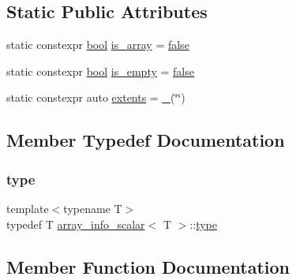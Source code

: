 \subsection*{Static Public Attributes}
\begin{DoxyCompactItemize}
\item 
static constexpr \mbox{\hyperlink{asdl_8h_af6a258d8f3ee5206d682d799316314b1}{bool}} \mbox{\hyperlink{structarray__info__scalar_a47f7961dd80e4ade11cd580835b12083}{is\+\_\+array}} = \mbox{\hyperlink{asdl_8h_af6a258d8f3ee5206d682d799316314b1ae9de385ef6fe9bf3360d1038396b884c}{false}}
\item 
static constexpr \mbox{\hyperlink{asdl_8h_af6a258d8f3ee5206d682d799316314b1}{bool}} \mbox{\hyperlink{structarray__info__scalar_aad5f2d891b5d8552e88e6da41d40d1c2}{is\+\_\+empty}} = \mbox{\hyperlink{asdl_8h_af6a258d8f3ee5206d682d799316314b1ae9de385ef6fe9bf3360d1038396b884c}{false}}
\item 
static constexpr auto \mbox{\hyperlink{structarray__info__scalar_a8908646f2c1f7331a8fac332c5fb1cd6}{extents}} = \mbox{\hyperlink{descr_8h_af114703e20c6527e87163eb2798f74b8}{\+\_\+}}(\char`\"{}\char`\"{})
\end{DoxyCompactItemize}


\subsection{Member Typedef Documentation}
\mbox{\label{structarray__info__scalar_a095b43f154578da44d1206e35d81cef4}} 
\subsubsection{\texorpdfstring{type}{type}}
{\footnotesize\ttfamily template$<$typename T$>$ \\
typedef T \mbox{\hyperlink{structarray__info__scalar}{array\+\_\+info\+\_\+scalar}}$<$ T $>$\+::\mbox{\hyperlink{structarray__info__scalar_a095b43f154578da44d1206e35d81cef4}{type}}}



\subsection{Member Function Documentation}
\mbox{\label{structarray__info__scalar_ae04c8e13cf1152eda868be73d269f801}} 
